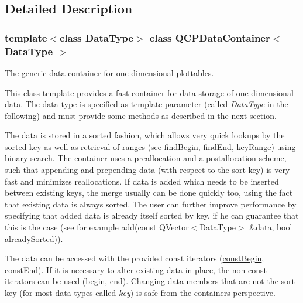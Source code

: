 \subsection{Detailed Description}
\subsubsection*{template$<$class Data\+Type$>$\newline
class Q\+C\+P\+Data\+Container$<$ Data\+Type $>$}

The generic data container for one-\/dimensional plottables. 

This class template provides a fast container for data storage of one-\/dimensional data. The data type is specified as template parameter (called {\itshape Data\+Type} in the following) and must provide some methods as described in the \hyperlink{classQCPDataContainer_qcpdatacontainer-datatype}{next section}.

The data is stored in a sorted fashion, which allows very quick lookups by the sorted key as well as retrieval of ranges (see \hyperlink{classQCPDataContainer_a2ad8a5399072d99a242d3a6d2d7e278a}{find\+Begin}, \hyperlink{classQCPDataContainer_afb8b8f23cc2b7234a793a25ce79fe48f}{find\+End}, \hyperlink{classQCPDataContainer_aba6e1a93c21ccc56a432b4a02c9d0ed2}{key\+Range}) using binary search. The container uses a preallocation and a postallocation scheme, such that appending and prepending data (with respect to the sort key) is very fast and minimizes reallocations. If data is added which needs to be inserted between existing keys, the merge usually can be done quickly too, using the fact that existing data is always sorted. The user can further improve performance by specifying that added data is already itself sorted by key, if he can guarantee that this is the case (see for example \hyperlink{classQCPDataContainer_a51d2a4c9ce4baf5e950b767d26673972}{add(const Q\+Vector$<$\+Data\+Type$>$ \&data, bool already\+Sorted)}).

The data can be accessed with the provided const iterators (\hyperlink{classQCPDataContainer_a49d7622999e2de67fa2331626a3159aa}{const\+Begin}, \hyperlink{classQCPDataContainer_aa7f7cf239b85b1a28de3d675cc5b3da1}{const\+End}). If it is necessary to alter existing data in-\/place, the non-\/const iterators can be used (\hyperlink{classQCPDataContainer_a80032518413ab8f418f7c81182fd06cb}{begin}, \hyperlink{classQCPDataContainer_acf66dfad83fe041380f5e0491e7676f2}{end}). Changing data members that are not the sort key (for most data types called {\itshape key}) is safe from the container\textquotesingle{}s perspective.

